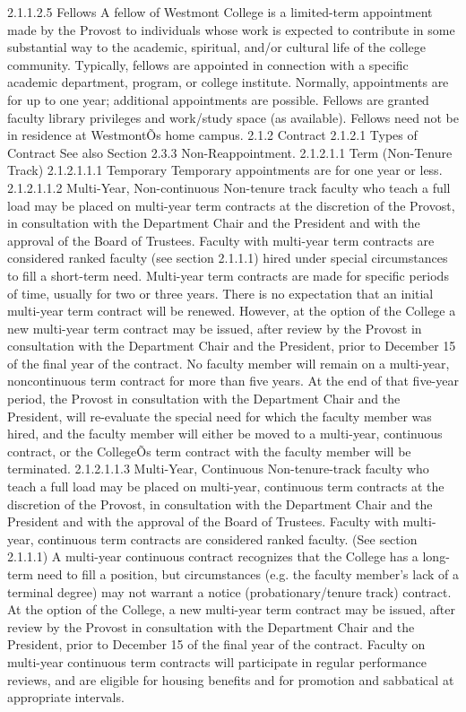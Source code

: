 \documentclass[letterpaper, 11pt]{article}
\begin{document}
2.1.1.2.5 Fellows
   A fellow of Westmont College is a limited-term appointment made by the Provost to individuals whose work is expected to contribute in some substantial way to the academic, spiritual, and/or cultural life of the college community.  Typically, fellows are appointed in connection with a specific academic department, program, or college institute.  Normally, appointments are for up to one year; additional appointments are possible.  Fellows are granted faculty library privileges and work/study space (as available).  Fellows need not be in residence at WestmontÕs home campus.
2.1.2 Contract
2.1.2.1 Types of Contract
   See also Section 2.3.3 Non-Reappointment.
2.1.2.1.1 Term (Non-Tenure Track)
2.1.2.1.1.1 Temporary
   Temporary appointments are for one year or less.
2.1.2.1.1.2 Multi-Year, Non-continuous
   Non-tenure track faculty who teach a full load may be placed on multi-year term contracts at the discretion of the Provost, in consultation with the Department Chair and the President and with the approval of the Board of Trustees.  Faculty with multi-year term contracts are considered ranked faculty (see section 2.1.1.1) hired under special circumstances to fill a short-term need.  Multi-year term contracts are made for specific periods of time, usually for two or three years.  There is no expectation that an initial multi-year term contract will be renewed.  However, at the option of the College a new multi-year term contract may be issued, after review by the Provost in consultation with the Department Chair and the President, prior to December 15 of the final year of the contract.  No faculty member will remain on a multi-year, noncontinuous term contract for more than five years.  At the end of that five-year period, the Provost in consultation with the Department Chair and the President, will re-evaluate the special need for which the faculty member was hired, and the faculty member will either be moved to a multi-year, continuous contract, or the CollegeÕs term contract with the faculty member will be terminated.
2.1.2.1.1.3 Multi-Year, Continuous
   Non-tenure-track faculty who teach a full load may be placed on multi-year, continuous term contracts at the discretion of the Provost, in consultation with the Department Chair and the President and with the approval of the Board of Trustees. Faculty with multi-year, continuous term contracts are considered ranked faculty.  (See section 2.1.1.1)  A multi-year continuous contract recognizes that the College has a long-term need to fill a position, but circumstances (e.g. the faculty member's lack of a terminal degree) may not warrant a notice (probationary/tenure track) contract.  At the option of the College, a new multi-year term contract may be issued, after review by the Provost in consultation with the Department Chair and the President, prior to December 15 of the final year of the contract. Faculty on multi-year continuous term contracts will participate in regular performance reviews, and are eligible for housing benefits and for promotion and sabbatical at appropriate intervals.
\end{document}
